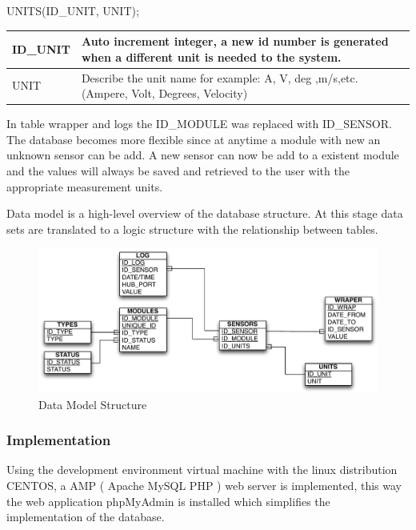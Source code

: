 UNITS(ID\_UNIT, UNIT);

\begin{table}[H]
\centering
	\begin{tabular}{| p{2cm} | p{10cm} |}
		\hline
		ID\_UNIT & Auto increment integer, a new id number is generated when a different unit is needed to the system. \\\hline
		UNIT & Describe the unit name for example: A, V, deg ,m/s,etc. (Ampere, Volt, Degrees, Velocity)\\\hline
	\end{tabular}
\end{table}

In table wrapper and logs the ID\_MODULE was replaced with ID\_SENSOR. The database becomes more flexible since at anytime a module with new an unknown sensor can be add. A new sensor can now be add to a existent module and the values will always be saved and retrieved to the user with the appropriate measurement units.

Data model is a high-level overview of the database structure. At this stage data sets are translated to a logic structure with the relationship between tables.

\begin{figure}[H]
	\begin{centering}
		\includegraphics[width=1.0\textwidth]{images/db_structure.pdf}
		\caption{Data Model Structure}
	\end{centering}
\end{figure}


%	
%	

\subsubsection{Implementation}
Using the development environment virtual machine with the linux distribution CENTOS, a AMP ( Apache MySQL PHP ) web server is implemented, this way the web application phpMyAdmin is installed which simplifies the implementation of the database.

